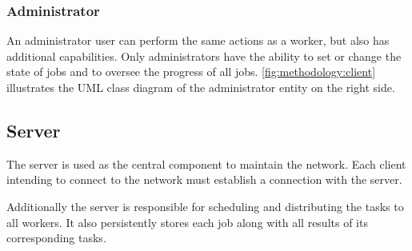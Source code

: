 \subsubsection{Administrator}
\label{ssubsec:methodology:entities:client:admin}
An administrator user can perform the same actions as a worker, but also has additional capabilities. Only administrators have the ability to set or change the state of jobs and to oversee the progress of all jobs. \autoref{fig:methodology:client} illustrates the \ac{UML} class diagram of the administrator entity on the right side.

\subsection{Server}
\label{subsec:methodology:entities:Server}
The server is used as the central component to maintain the network. Each client intending to connect to the network must establish a connection with the server.

Additionally the server is responsible for scheduling and distributing the tasks to all workers. It also persistently stores each job along with all results of its corresponding tasks.

